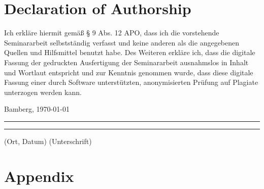 \documentclass[a4paper]{article}
\begin{document}
{\parindent 0cm
\section*{Declaration of Authorship}
Ich erkläre hiermit gemäß § 9 Abs. 12 APO, dass ich die vorstehende Seminararbeit selbstständig verfasst und keine anderen als die angegebenen Quellen und Hilfsmittel benutzt habe. Des Weiteren erkläre ich, dass die digitale Fassung der gedruckten Ausfertigung der Seminararbeit ausnahmslos in Inhalt und Wortlaut entspricht und zur Kenntnis genommen wurde, dass diese digitale Fassung einer durch Software unterstützten, anonymisierten Prüfung auf Plagiate unterzogen werden kann.\\
\vspace{2\baselineskip}
  
Bamberg, \today

\rule[0.5em]{14em}{0.5pt} \hspace{0.25\linewidth}\rule[0.5em]{14em}{0.5pt}
\vspace{1em}
\hspace{4em} (Ort, Datum) \hspace{0.51\linewidth} (Unterschrift)
}







\appendix


\section{Appendix}


\end{document}
